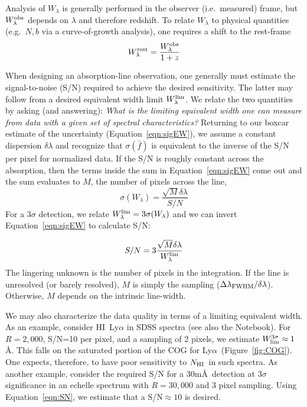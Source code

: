 \documentclass[graybox]{svmult}
\newcommand{\HI}{H{\sc I}}
\def\lya{Ly$\alpha$}
\newcommand{\mnhi}{N_{\rm HI}}
\newcommand{\nhi}{$\mnhi$}
\begin{document}
Analysis of $W_\lambda$ is 
generally performed in the observer (i.e.\ measured) frame,
but $W_\lambda^{\rm obs}$ depends on $\lambda$ and therefore redshift.
To relate $W_\lambda$ to physical quantities (e.g.\ $N,b$ via a
curve-of-growth analysis),  one requires a shift to the rest-frame
\begin{equation}
W_\lambda^{\rm rest} = \frac{W_\lambda^{\rm obs}}{1+z}
\end{equation}

When designing an absorption-line observation, one generally
must estimate the signal-to-noise (S/N) required to achieve
the desired sensitivity.   The latter may follow from a
desired equivalent width limit $W_\lambda^{\rm lim}$.
We relate the two quantities by asking (and answering):
{\it What is the limiting equivalent width one can measure from
data with a given set of spectral characteristics?}
Returning to our boxcar estimate of the uncertainty 
(Equation~\ref{eqn:sigEW}), we 
assume a constant dispersion $\delta\lambda$ and
recognize that $\sigma(\bar f)$ is equivalent to 
the inverse of the S/N per pixel for normalized data.
If the S/N is roughly constant across the absorption,
then the terms inside the sum in Equation~\ref{eqn:sigEW}
come out and the sum evaluates to $M$, the number of pixels
across the line, 
\begin{equation}
\sigma(W_\lambda) = \frac{\sqrt{M} \delta\lambda}{S/N}
\label{eqn:sigSN}
\end{equation}
For a $3\sigma$ detection, we relate 
$W_\lambda^{\rm lim} = 3 \sigma(W_\lambda)$ and we can invert
Equation~\ref{eqn:sigEW} to calculate S/N:

\begin{equation}
S/N = 3 \frac{\sqrt{M} \delta\lambda}{W_\lambda^{\rm lim}}
\label{eqn:SN}
\end{equation}
The lingering unknown is the number of pixels in the
integration.
If the line is unresolved (or barely resolved), 
$M$ is simply the sampling ($\Delta\lambda_{\rm FWHM} / \delta\lambda$).
Otherwise, $M$ depends on the intrinsic line-width. 

We may also characterize the data quality in terms of a
limiting equivalent width.  As an example, consider 
\HI\ Ly$\alpha$ in SDSS spectra (see also the Notebook).
For $R=2,000$, S/N=10 per pixel, and a sampling of 2 pixels,
we estimate  $W_{\rm lim}^{3\sigma} \approx 1$\AA.
This falls on the saturated portion of the COG for \lya\
(Figure~\ref{fig:COG}).  One expects, therefore,
to have  poor sensitivity to \nhi\ in such spectra. 
As another example, consider the required S/N for a 
30m\AA\ detection at $3\sigma$ significance in an echelle
spectrum with $R=30,000$ and 3 pixel sampling.  Using
Equation~\ref{eqn:SN}, we estimate that a 
S/N$\approx 10$ is desired.
\end{document}
